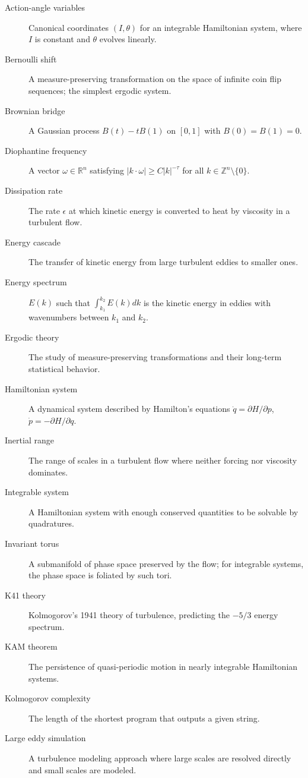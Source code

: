\begin{description}
    \item[Action-angle variables] Canonical coordinates $(I, \theta)$ for an integrable Hamiltonian system, where $I$ is constant and $\theta$ evolves linearly.
    \item[Bernoulli shift] A measure-preserving transformation on the space of infinite coin flip sequences; the simplest ergodic system.
    \item[Brownian bridge] A Gaussian process $B(t) - tB(1)$ on $[0,1]$ with $B(0) = B(1) = 0$.
    \item[Diophantine frequency] A vector $\omega \in \mathbb{R}^n$ satisfying $|k \cdot \omega| \geq C|k|^{-\tau}$ for all $k \in \mathbb{Z}^n \setminus \{0\}$.
    \item[Dissipation rate] The rate $\epsilon$ at which kinetic energy is converted to heat by viscosity in a turbulent flow.
    \item[Energy cascade] The transfer of kinetic energy from large turbulent eddies to smaller ones.
    \item[Energy spectrum] $E(k)$ such that $\int_{k_1}^{k_2} E(k) dk$ is the kinetic energy in eddies with wavenumbers between $k_1$ and $k_2$.
    \item[Ergodic theory] The study of measure-preserving transformations and their long-term statistical behavior.
    \item[Hamiltonian system] A dynamical system described by Hamilton's equations $\dot{q} = \partial H/\partial p$, $\dot{p} = -\partial H/\partial q$.
    \item[Inertial range] The range of scales in a turbulent flow where neither forcing nor viscosity dominates.
    \item[Integrable system] A Hamiltonian system with enough conserved quantities to be solvable by quadratures.
    \item[Invariant torus] A submanifold of phase space preserved by the flow; for integrable systems, the phase space is foliated by such tori.
    \item[K41 theory] Kolmogorov's 1941 theory of turbulence, predicting the $-5/3$ energy spectrum.
    \item[KAM theorem] The persistence of quasi-periodic motion in nearly integrable Hamiltonian systems.
    \item[Kolmogorov complexity] The length of the shortest program that outputs a given string.
    \item[Large eddy simulation] A turbulence modeling approach where large scales are resolved directly and small scales are modeled.

\end{description}
